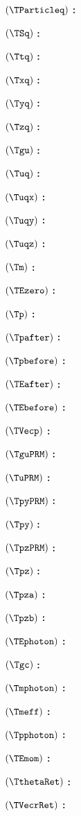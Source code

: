 $( \TParticleq )$ \textbf{:} \TParticleqdef

$( \TSq )$ \textbf{:} \TSqdef

$( \Ttq )$ \textbf{:} \Ttqdef

$( \Txq )$ \textbf{:} \Txqdef

$( \Tyq )$ \textbf{:} \Tyqdef

$( \Tzq )$ \textbf{:} \Tzqdef

$( \Tgu )$ \textbf{:} \Tgudef

$( \Tuq )$ \textbf{:} \Tuqdef

$( \Tuqx )$ \textbf{:} \Tuqxdef

$( \Tuqy )$ \textbf{:} \Tuqydef

$( \Tuqz )$ \textbf{:} \Tuqzdef

$( \Tm )$ \textbf{:} \Tmdef

$( \TEzero )$ \textbf{:} \TEzerodef

$( \Tp )$ \textbf{:} \Tpdef

$( \Tpafter )$ \textbf{:} \Tpafterdef

$( \Tpbefore )$ \textbf{:} \Tpbeforedef

$( \TEafter )$ \textbf{:} \TEafterdef

$( \TEbefore )$ \textbf{:} \TEbeforedef

$( \TVecp )$ \textbf{:} \TVecpdef

$( \TguPRM )$ \textbf{:} \TguPRMdef

$( \TuPRM )$ \textbf{:} \TuPRMdef

$( \TpyPRM )$ \textbf{:} \TpyPRMdef

$( \Tpy )$ \textbf{:} \Tpydef

$( \TpzPRM )$ \textbf{:} \TpzPRMdef

$( \Tpz )$ \textbf{:} \Tpzdef

$( \Tpza )$ \textbf{:} \Tpzadef

$( \Tpzb )$ \textbf{:} \Tpzbdef

$( \TEphoton )$ \textbf{:} \TEphotondef

$( \Tgc )$ \textbf{:} \Tgcdef

$( \Tmphoton )$ \textbf{:} \Tmphotondef

$( \Tmeff )$ \textbf{:} \Tmeffdef

$( \Tpphoton )$ \textbf{:} \Tpphotondef

$( \TEmom )$ \textbf{:} \TEmomdef

$( \TthetaRet )$ \textbf{:} \TthetaRetdef

$( \TVecrRet )$ \textbf{:} \TVecrRetdef

